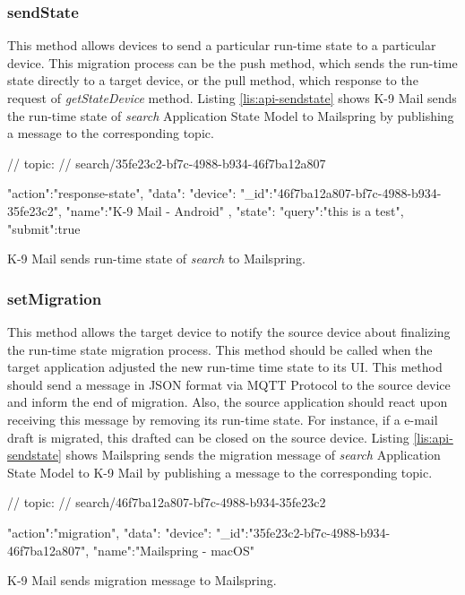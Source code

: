 \subsubsection{sendState}
This method allows devices to send a particular run-time state to a particular device. This migration process can be the push method, which sends the run-time state directly to a target device, or the pull method, which response to the request of \textit{getStateDevice} method. Listing \ref{lis:api-sendstate} shows K-9 Mail sends the run-time state of \textit{search} Application State Model to Mailspring by publishing a message to the corresponding topic.


\FloatBarrier
\begin{code}
\begin{js2}
// topic:
// search/35fe23c2-bf7c-4988-b934-46f7ba12a807
\end{js2}

\begin{json}
{
   "action":"response-state",
   "data":{
      "device":{
         "_id":"46f7ba12a807-bf7c-4988-b934-35fe23c2",
         "name":"K-9 Mail - Android"
      },
      "state":{
         "query":"this is a test",
         "submit":true
      }
   }
}
\end{json}
\caption{K-9 Mail sends run-time state of \textit{search} to Mailspring.}
\label{lis:api-sendstate}
\end{code}
\FloatBarrier

\subsubsection{setMigration}
This method allows the target device to notify the source device about finalizing the run-time state migration process. This method should be called when the target application adjusted the new run-time time state to its UI. This method should send a message in JSON format via MQTT Protocol to the source device and inform the end of migration. Also, the source application should react upon receiving this message by removing its run-time state. For instance, if a e-mail draft is migrated, this drafted can be closed on the source device. Listing \ref{lis:api-sendstate} shows Mailspring sends the migration message of \textit{search} Application State Model to K-9 Mail by publishing a message to the corresponding topic.

\FloatBarrier
\begin{code}
\begin{js2}
// topic:
// search/46f7ba12a807-bf7c-4988-b934-35fe23c2
\end{js2}

\begin{json}
{
   "action":"migration",
   "data":{
      "device":{
         "_id":"35fe23c2-bf7c-4988-b934-46f7ba12a807",
         "name":"Mailspring - macOS"
      }
   }
}
\end{json}
\caption{K-9 Mail sends migration message to Mailspring.}
\label{lis:api-setmigration}
\end{code}
\FloatBarrier

